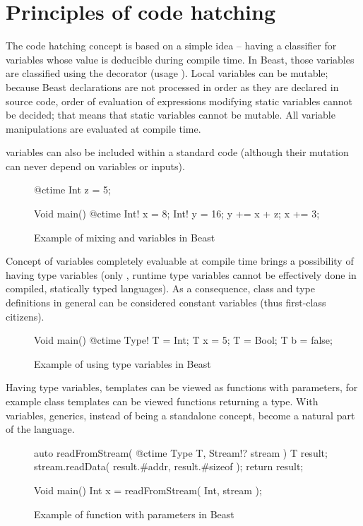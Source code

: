 \documentclass{ExcelAtFIT}
\begin{document}
\section{Principles of code hatching}

The code hatching concept is based on a simple idea -- having a classifier for variables whose value is deducible during compile time. In Beast, those variables are classified using the  decorator (usage ). Local \ctime variables can be mutable; because Beast declarations are not processed in order as they are declared in source code, order of evaluation of expressions modifying static \ctime variables cannot be decided; that means that static \ctime variables cannot be mutable. All \ctime variable manipulations are evaluated at compile time.

\ctime variables can also be included within a standard code (although their mutation can never depend on \nonctime variables or inputs).

\begin{figure}[h]
	\begin{code}
@ctime Int z = 5;
		
Void main() {
	@ctime Int! x = 8;
	Int! y = 16;
	y += x + z;
	x += 3;
}
	\end{code}
	\caption{Example of mixing \ctime and \nonctime variables in Beast}
\end{figure}

Concept of variables completely evaluable at compile time brings a possibility of having type variables (only \ctime, runtime type variables cannot be effectively done in compiled, statically typed languages). As a consequence, class and type definitions in general can be considered \ctime constant variables (thus first-class citizens).

\begin{figure}[h]
	\begin{code}
Void main() {
	@ctime Type! T = Int;
	T x = 5;
	T = Bool;
	T b = false;
}
	\end{code}
	\caption{Example of using type variables in Beast}
\end{figure}

Having type variables, templates can be viewed as functions with \ctime parameters, for example class templates can be viewed functions returning a type. With \ctime variables, generics, instead of being a standalone concept, become a natural part of the language.

\begin{figure}[h]
	\begin{code}
auto readFromStream( @ctime Type T, Stream!? stream )
{
	T result;
	stream.readData( result.#addr, result.#sizeof );
	return result;
}

Void main() {
	Int x = readFromStream( Int, stream );
}
	\end{code}
	\caption{Example of function with \ctime parameters in Beast}
\end{figure}
\end{document}
